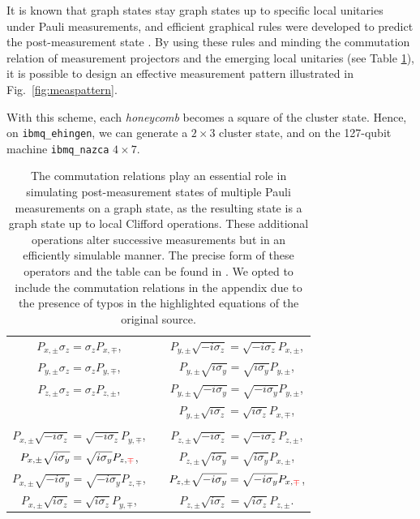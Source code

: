 \documentclass[../main.tex]{subfiles}
\begin{document}
It is known that graph states stay graph states up to specific local unitaries under Pauli measurements, and efficient graphical rules were developed to predict the post-measurement state \cite{hein2006entanglement, anders2006fast}. 
By using these rules and minding the commutation relation of measurement projectors and the emerging local unitaries (see Table \ref{tab:commutation_relations}), it is possible to design an effective measurement pattern illustrated in Fig.~\ref{fig:measpattern}. 

With this scheme, each \textit{honeycomb} becomes a square of the cluster state. Hence, on \texttt{ibmq\_ehingen}, we can generate a $2\times3$ cluster state, and on the 127-qubit machine \texttt{ibmq\_nazca} $4\times7$.

\begin{table}
    \centering
    \begin{tabular}{ccc}
         $P_{x,\pm} \sigma_z = \sigma_z P_{x,\mp}$, & \quad &  $P_{y,\pm} \sqrt{-i\sigma_z} = \sqrt{-i\sigma_z} P_{x,\pm}$, \\ 
         $P_{y,\pm} \sigma_z = \sigma_z P_{y,\mp}$, & \quad &  $P_{y,\pm} \sqrt{i\sigma_y} = \sqrt{i\sigma_y} P_{y,\pm}$, \\
         $P_{z,\pm} \sigma_z = \sigma_z P_{z,\pm}$, & \quad &  $P_{y,\pm} \sqrt{-i\sigma_y} = \sqrt{-i\sigma_y} P_{y,\pm}$, \\
         \quad & \quad &                                        $P_{y,\pm} \sqrt{i\sigma_z} = \sqrt{i\sigma_z}P_{x,\mp}$, \\
         
         \quad & \quad & \quad \\
         
         $P_{x,\pm} \sqrt{-i\sigma_z} = \sqrt{-i\sigma_z} P_{y,\mp}$,                & \quad &  $P_{z,\pm} \sqrt{-i\sigma_z} = \sqrt{-i\sigma_z} P_{z,\pm}$, \\
         $P_{x,\pm} \sqrt{i\sigma_y} = \sqrt{i\sigma_y} P_{z,\textcolor{red}{\mp}}$, & \quad &  $P_{z,\pm} \sqrt{i\sigma_y} = \sqrt{i\sigma_y} P_{x,\pm}$, \\
         $P_{x,\pm} \sqrt{-i\sigma_y} = \sqrt{-i\sigma_y} P_{z,\mp}$,                & \quad &  $P_{z,\pm} \sqrt{-i\sigma_y} = \sqrt{-i\sigma_y} P_{x,\textcolor{red}{\mp}}$, \\
         $P_{x,\pm} \sqrt{i\sigma_z} =\sqrt{i\sigma_z} P_{y,\mp}$,                   & \quad &  $P_{z,\pm} \sqrt{i\sigma_z} = \sqrt{i\sigma_z} P_{z,\pm}$. \\
    \end{tabular}
    \caption{The commutation relations play an essential role in simulating post-measurement states of multiple Pauli measurements on a graph state, as the resulting state is a graph state up to local Clifford operations. These additional operations alter successive measurements but in an efficiently simulable manner. The precise form of these operators and the table can be found in \cite{hein2006entanglement}. We opted to include the commutation relations in the appendix due to the presence of typos in the highlighted equations of the original source. }
    \label{tab:commutation_relations}
\end{table}
\end{document}
